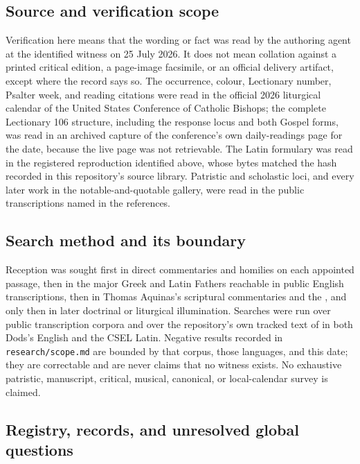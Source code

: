 \subsection*{Source and verification scope}

Verification here means that the wording or fact was read by the authoring
agent at the identified witness on 25 July 2026. It does not mean collation
against a printed critical edition, a page-image facsimile, or an official
delivery artifact, except where the record says so. The occurrence, colour,
Lectionary number, Psalter week, and reading citations were read in the
official 2026 liturgical calendar of the United States Conference of Catholic
Bishops; the complete Lectionary 106 structure, including the response locus
and both Gospel forms, was read in an archived capture of the conference's
own daily-readings page for the date, because the live page was not
retrievable. The Latin formulary was read in the registered reproduction
identified above, whose bytes matched the hash recorded in this repository's
source library. Patristic and scholastic loci, and every later work in the
notable-and-quotable gallery, were read in the public transcriptions named in
the references.

\subsection*{Search method and its boundary}

Reception was sought first in direct commentaries and homilies on each
appointed passage, then in the major Greek and Latin Fathers reachable in
public English transcriptions, then in Thomas Aquinas's scriptural commentaries
and the , and only then in later doctrinal or liturgical
illumination. Searches were run over public transcription corpora and over the
repository's own tracked text of  in both Dods's English
and the CSEL Latin. Negative results recorded in \texttt{research/scope.md} are
bounded by that corpus, those languages, and this date; they are correctable
and are never claims that no witness exists. No exhaustive patristic,
manuscript, critical, musical, canonical, or local-calendar survey is claimed.

\subsection*{Registry, records, and unresolved global questions}

